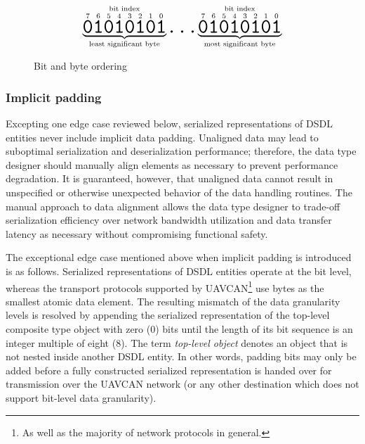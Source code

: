 \begin{figure}[H]
    $$
    \overset{\text{bit index}}{%
        \underbrace{%
            \overset{7}{\hugett{0}}
            \overset{6}{\hugett{1}}
            \overset{5}{\hugett{0}}
            \overset{4}{\hugett{1}}
            \overset{3}{\hugett{0}}
            \overset{2}{\hugett{1}}
            \overset{1}{\hugett{0}}
            \overset{0}{\hugett{1}}
        }_\text{least significant byte}%
    }
    \hugett{\ldots}
    \overset{\text{bit index}}{%
        \underbrace{%
            \overset{7}{\hugett{0}}
            \overset{6}{\hugett{1}}
            \overset{5}{\hugett{0}}
            \overset{4}{\hugett{1}}
            \overset{3}{\hugett{0}}
            \overset{2}{\hugett{1}}
            \overset{1}{\hugett{0}}
            \overset{0}{\hugett{1}}
        }_\text{most significant byte}%
    }
    $$
    \caption{Bit and byte ordering\label{fig:dsdl_serialization_bit_ordering}}
\end{figure}

\subsubsection{Implicit padding}

Excepting one edge case reviewed below,
serialized representations of DSDL entities never include implicit data padding.
Unaligned data may lead to suboptimal serialization and deserialization performance;
therefore, the data type designer should manually align elements as necessary to prevent performance degradation.
It is guaranteed, however, that unaligned data cannot result in unspecified or otherwise unexpected behavior
of the data handling routines.
The manual approach to data alignment allows the data type designer to trade-off serialization efficiency
over network bandwidth utilization and data transfer latency as necessary without compromising functional safety.

The exceptional edge case mentioned above when implicit padding is introduced is as follows.
Serialized representations of DSDL entities operate at the bit level,
whereas the transport protocols supported by UAVCAN\footnote{As well as the majority of network protocols in general.}
use bytes as the smallest atomic data element.
The resulting mismatch of the data granularity levels is resolved by
appending the serialized representation of the top-level composite type object with zero (0) bits
until the length of its bit sequence is an integer multiple of eight (8).
The term \emph{top-level object} denotes an object that is not nested inside another DSDL entity.
In other words, padding bits may only be added before a fully constructed serialized representation is
handed over for transmission over the UAVCAN network
(or any other destination which does not support bit-level data granularity).

